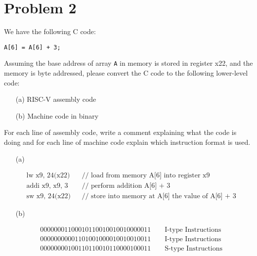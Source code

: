 \documentclass[12pt]{article}
\begin{document}
        \section*{Problem 2}
        \noindent We have the following C code:
        \begin{center}

            \texttt{A[6] = A[6] + 3;}
        \end{center}
        Assuming the base address of array \texttt{A} in memory is stored in
        register x22, and the memory is byte addressed, please convert the C
        code to the following lower-level code:
        \begin{itemize}
            \item[(a)] RISC-V assembly code
            \item[(b)] Machine code in binary
        \end{itemize}
        For each line of assembly code, write a comment explaining what the code
        is doing and for each line of machine code explain which instruction
        format is used.
        \begin{itemize}
            \item[(a)]
        \end{itemize}
        \begin{align*}
            &\text{lw x9, 24(x22)} &&\text{// load from memory A[6] into register x9} \\
            &\text{addi x9, x9, 3} &&\text{// perform addition A[6] + 3} \\
            &\text{sw x9, 24(x22)} &&\text{// store into memory at A[6] the value of A[6] + 3}
        \end{align*}
        \begin{itemize}
            \item[(b)]
        \end{itemize}
        \begin{align*}
            &000000011000 10110 010 01001 0000011\qquad \text{I-type Instructions} \\
            &000000000011 01001 000 01001 0010011\qquad \text{I-type Instructions} \\
            &0000000 01001 10110 010 11000 0100011\qquad \text{S-type Instructions}
        \end{align*}
\end{document}

